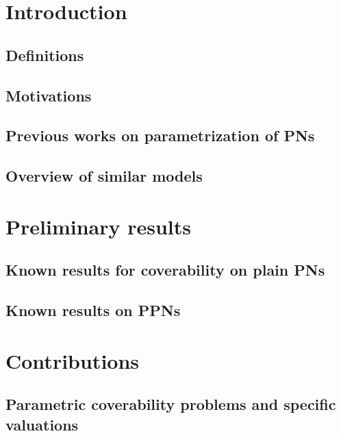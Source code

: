 \documentclass[11pt,a4paper,oneside]{book}
\theoremstyle{plain}
\theoremstyle{definition}
\theoremstyle{remark}
\begin{document}
\thispagestyle{empty} 
\setcounter{page}{0}
\tableofcontents
\acresetall

\mainmatter
\setcounter{page}{1}

\chapter{Introduction}

\section{Definitions}

\section{Motivations}


\section{Previous works on parametrization of \acp{PN}}

\section{Overview of similar models}


\chapter{Preliminary results}

\section{Known results for coverability on plain \acp{PN}}

\section{Known results on \acp{PPN}}


\chapter{Contributions}

\section{Parametric coverability problems and specific valuations}

\end{document}
